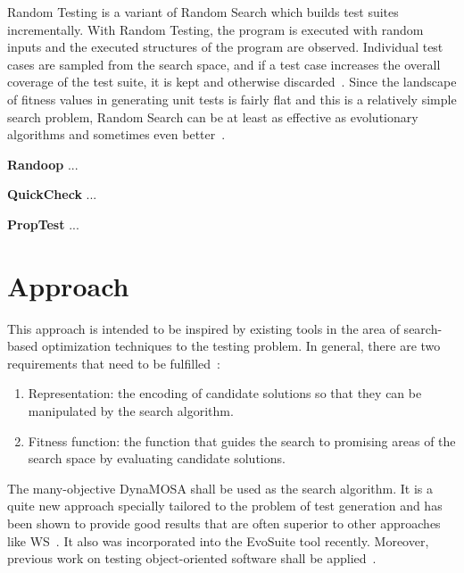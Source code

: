 \documentclass{article}
\begin{document}
Random Testing is a variant of Random Search which builds test suites incrementally. With Random Testing, the program is executed with random inputs and the executed structures of the program are observed. Individual test cases are sampled from the search space, and if a test case increases the overall coverage of the test suite, it is kept and otherwise discarded~\cite{Campos2017}. Since the landscape of fitness values in generating unit tests is fairly flat and this is a relatively simple search problem, Random Search can be at least as effective as evolutionary algorithms and sometimes even better~\cite{Shamshiri2015a}.

\textbf{Randoop} ...

\textbf{QuickCheck} ...

\textbf{PropTest} ...


\section{Approach}
This approach is intended to be inspired by existing tools in the area of search-based optimization techniques to the testing problem. In general, there are two requirements that need to be fulfilled~\cite{Harman2001}:
\begin{enumerate}
    \item Representation: the encoding of candidate solutions so that they can be manipulated by the search algorithm.
    \item Fitness function: the function that guides the search to promising areas of the search space by evaluating candidate solutions.
\end{enumerate}
The many-objective \ac{DynaMOSA} shall be used as the search algorithm. It is a quite new approach specially tailored to the problem of test generation and has been shown to provide good results that are often superior to other approaches like \ac{WS}~\cite{Campos2017}. It also was incorporated into the EvoSuite tool recently. Moreover, previous work on testing object-oriented software shall be applied~\cite{Tonella2004,Fraser2012}. 
\end{document}
